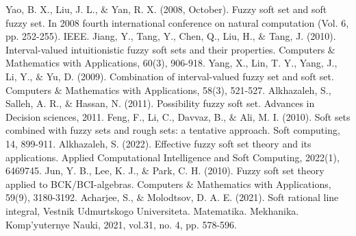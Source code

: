 \documentclass{article}
\theoremstyle{definition}
\begin{document}
\begin{thebibliography}{}
   Yao, B. X., Liu, J. L., $\&$ Yan, R. X. (2008, October). Fuzzy soft set and soft fuzzy set. In 2008 fourth international conference on natural computation (Vol. 6, pp. 252-255). IEEE.
   Jiang, Y., Tang, Y., Chen, Q., Liu, H., $\&$ Tang, J. (2010). Interval-valued intuitionistic fuzzy soft sets and their properties. Computers $\&$ Mathematics with Applications, 60(3), 906-918.
   Yang, X., Lin, T. Y., Yang, J., Li, Y., $\&$ Yu, D. (2009). Combination of interval-valued fuzzy set and soft set. Computers $\&$ Mathematics with Applications, 58(3), 521-527.
   Alkhazaleh, S., Salleh, A. R., $\&$ Hassan, N. (2011). Possibility fuzzy soft set. Advances in Decision sciences, 2011.
   Feng, F., Li, C., Davvaz, B., $\&$ Ali, M. I. (2010). Soft sets combined with fuzzy sets and rough sets: a tentative approach. Soft computing, 14, 899-911.
   Alkhazaleh, S. (2022). Effective fuzzy soft set theory and its applications. Applied Computational Intelligence and Soft Computing, 2022(1), 6469745.
   Jun, Y. B., Lee, K. J., $\&$ Park, C. H. (2010). Fuzzy soft set theory applied to BCK/BCI-algebras. Computers $\&$ Mathematics with Applications, 59(9), 3180-3192.
   Acharjee, S., $\&$ Molodtsov, D. A. E. (2021). Soft rational line integral, Vestnik Udmurtskogo Universiteta. Matematika. Mekhanika. Komp'yuternye Nauki, 2021,  vol.31, no. 4, pp. 578-596.
\end{thebibliography}
\end{document}
